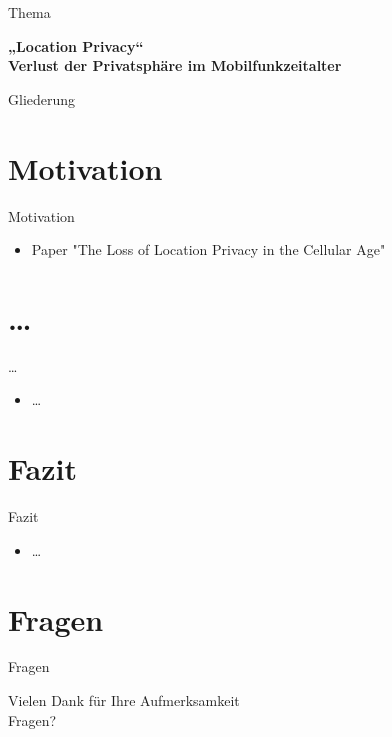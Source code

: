 



\begin{frame}
 \titlepage
\end{frame}

\begin{frame}{Thema}
\begin{center}
\huge \textbf{„Location Privacy“\\ \vspace{.5cm}
Verlust der Privatsphäre im Mobilfunkzeitalter
}
\end{center}
\end{frame}

\begin{frame}{Gliederung}
 \tableofcontents[hideallsubsections]%
\end{frame}

\section{Motivation}
\begin{frame}{Motivation}
\begin{itemize}
\item Paper "The Loss of Location Privacy in the Cellular Age"
\end{itemize}
\end{frame}

\section{\dots}
\begin{frame}{\dots}
\begin{itemize}
\item \dots
\end{itemize}
\end{frame}


\section{Fazit}
\begin{frame}{Fazit}
\begin{itemize}
\item \dots
\end{itemize}
\end{frame} 

\section{Fragen}
\begin{frame}{Fragen}
\begin{center}
 \begin{Large}Vielen Dank für Ihre Aufmerksamkeit\\
 \vspace{1cm}
 Fragen?\end{Large}
\end{center}
\end{frame} 


